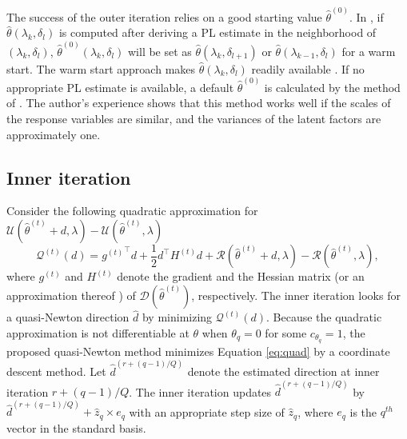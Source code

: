 \documentclass[nojss]{jss}
\begin{document}
The success of the outer iteration relies on a good starting value $\hat{\theta}^{(0)}$. In , if $\hat{\theta}(\lambda_{k},\delta_{l})$ is computed after deriving a PL estimate in the neighborhood of $(\lambda_{k},\delta_{l})$, $\hat{\theta}^{(0)}(\lambda_{k},\delta_{l})$ will be set as $\hat{\theta}(\lambda_{k},\delta_{l+1})$ or $\hat{\theta}(\lambda_{k-1},\delta_{l})$ for a warm start. The warm start approach makes $\hat{\theta}(\lambda_{k},\delta_{l})$ readily available \citep[see also][]{Friedman2010}. If no appropriate PL estimate is available, a default $\hat{\theta}^{(0)}$ is calculated by the method of \cite{McDonald1992}. The author's experience shows that this method works well if the scales of the response variables are similar, and the variances of the latent factors are approximately one.


\subsection{Inner iteration} \label{sec:opt_inner}
Consider the following quadratic approximation for $\mathcal{U}(\hat{\theta}^{(t)} + d, \lambda) - \mathcal{U}(\hat{\theta}^{(t)}, \lambda)$
%
\begin{equation} \label{eq:quad}
\mathcal{Q}^{(t)}(d) = {g^{(t)}}^\top d + \frac{1}{2} d^\top H^{(t)}  d + \mathcal{R}(\hat{\theta}^{(t)}+d,\lambda) - \mathcal{R}(\hat{\theta}^{(t)},\lambda),
\end{equation}
%
where $g^{(t)}$ and $H^{(t)}$ denote the gradient and the Hessian matrix (or an approximation thereof ) of $\mathcal{D}(\hat{\theta}^{(t)})$, respectively. The inner iteration looks for a quasi-Newton direction $\hat{d}$ by minimizing $\mathcal{Q}^{(t)}(d)$. Because the quadratic approximation is not differentiable at $\theta$ when $\theta_q=0$ for some $c_{\theta_q} = 1$, the proposed quasi-Newton method minimizes Equation \ref{eq:quad} by a coordinate descent method. Let $\hat{d}^{(r+(q-1)/Q)}$ denote the estimated direction at inner iteration $r+(q-1)/Q$. The inner iteration updates $\hat{d}^{(r+(q-1)/Q)}$ by $\hat{d}^{(r+(q-1)/Q)} + \hat{z}_{q} \times e_{q}$ with an appropriate step size of $\hat{z}_{q}$, where $e_{q}$ is the $q^{th}$ vector in the standard basis.
\end{document}
